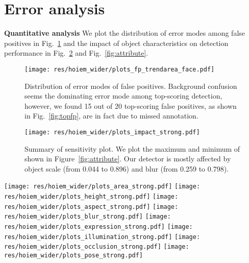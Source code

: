 \documentclass[10pt,twocolumn,letterpaper]{article}
\begin{document}
\appendix

\section{Error analysis}
\label{sec:error-analysis}

{\bf Quantitative analysis}
We plot the distribution of error modes among false positives in Fig.~\ref{fig:error} and the impact of object characteristics on detection performance in Fig.~\ref{fig:impact} and Fig.~\ref{fig:attribute}. 

\begin{figure}
  \centering
  \texttt{[image: res/hoiem\_wider/plots\_fp\_trendarea\_face.pdf]}
  \caption{\label{fig:error} Distribution of error modes of false positives. Background confusion seems the dominating error mode among top-scoring detection, however, we found 15 out of 20 top-scoring false positives, as shown in Fig.~\ref{fig:topfp}, are in fact due to missed annotation. }
\end{figure}

\begin{figure}
  \centering
  \texttt{[image: res/hoiem\_wider/plots\_impact\_strong.pdf]}
  \caption{\label{fig:impact} Summary of sensitivity plot. We plot the maximum and minimum of  shown in Figure~\ref{fig:attribute}. Our detector is mostly affected by object scale (from 0.044 to 0.896) and blur (from 0.259 to 0.798).}
\end{figure}

\begin{figure*}
  \centering
  \texttt{[image: res/hoiem\_wider/plots\_area\_strong.pdf]}
  \texttt{[image: res/hoiem\_wider/plots\_height\_strong.pdf]}
  \texttt{[image: res/hoiem\_wider/plots\_aspect\_strong.pdf]}
  \texttt{[image: res/hoiem\_wider/plots\_blur\_strong.pdf]}
  \texttt{[image: res/hoiem\_wider/plots\_expression\_strong.pdf]}
  \texttt{[image: res/hoiem\_wider/plots\_illumination\_strong.pdf]}
  \texttt{[image: res/hoiem\_wider/plots\_occlusion\_strong.pdf]}
  \texttt{[image: res/hoiem\_wider/plots\_pose\_strong.pdf]}
  \caption{Sensitivity and impact of object characteristics. We show normalized AP\cite{hoiem2012diagnosing} for each characteristics. Please refer to \cite{hoiem2012diagnosing} for definition of ``BBox Area'', ``BBox Height'', and ``Aspect Ratio'' and also refer to \cite{yang2016wider} for the definition of per-face attributes ``Blur'', ``Expression'', ``Illumination'', ``Occlusion'', and ``Pose''. Our detector performs under average in the case of extremely small scale, extremely skewed aspect ratio, heavy blur, and heavy occlusion. Surprisingly, exaggerated expression and extreme illumination correlate with better performance. Pose variation does not have noticeable affect. }
  \label{fig:attribute}
\end{figure*}
\end{document}
